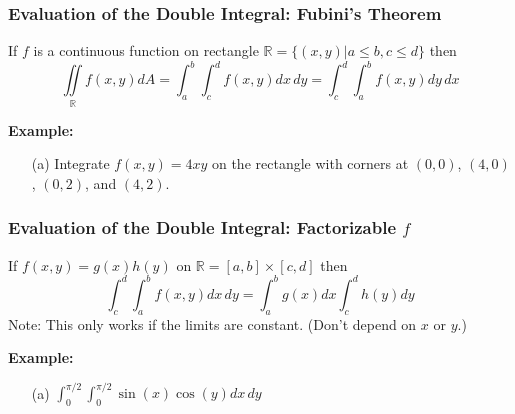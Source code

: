 \documentclass{beamer}
\begin{document}
\begin{frame}
\frametitle{\textbf{Evaluation of the Double Integral: Fubini's Theorem}}

\begin{theorem}
	If $f$ is a continuous function on rectangle $\mathbb{R} = \{(x,y)|a\leq b, c\leq d \}$ then
	$$\iint\limits_{\mathbb{R}} f(x,y)dA = \int_a^b \int_c^d f(x,y)dx\,dy = \int_c^d \int_a^b  f(x,y)dy\,dx $$
\end{theorem}


\vspace{12pt}

\textbf{Example:}

\begin{itemize}
	\item[(a)] Integrate $f(x,y) = 4xy$ on the rectangle with corners at $(0,0)$, $(4,0)$, $(0,2)$, and $(4,2)$.
\end{itemize}
\end{frame}

\begin{frame}
\frametitle{\textbf{Evaluation of the Double Integral: Factorizable $f$}}
If $f(x,y) = g(x)h(y)$ on $\mathbb{R} = [a,b] \times [c,d]$ then
$$\int_c^d \int_a^b f(x,y) dx\,dy = \int_a^bg(x)dx \int_c^d h(y)dy$$
Note: This only works if the limits are constant. (Don't depend on $x$ or $y$.)
\vspace{12pt}

\textbf{Example:}
\begin{itemize}
	\item[(a)] $\int_0^{\pi/2} \int_0^{\pi/2} \sin(x) \cos(y) dx \,dy$
\end{itemize}
\end{frame}
\end{document}
